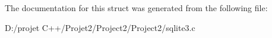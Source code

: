 \begin{DoxyCompactItemize}
\begin{tabbing}
\end{tabbing}\end{DoxyCompactItemize}


The documentation for this struct was generated from the following file\+:\begin{DoxyCompactItemize}
\item 
D\+:/projet C++/\+Projet2/\+Project2/\+Project2/sqlite3.\+c\end{DoxyCompactItemize}
